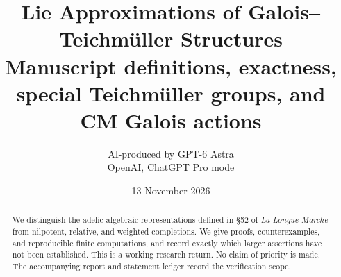 \documentclass[11pt,a4paper]{article}
\title{Lie Approximations of Galois--Teichm\"uller Structures\\
\large Manuscript definitions, exactness, special Teichm\"uller groups, and CM Galois actions}
\author{AI-produced by GPT-6 Astra\\OpenAI, ChatGPT Pro mode}
\date{13 November 2026}
\begin{document}
\maketitle
\begin{abstract}
We distinguish the adelic algebraic representations defined in \S52 of
\emph{La Longue Marche} from nilpotent, relative, and weighted completions.
We give proofs, counterexamples, and reproducible finite computations, and
record exactly which larger assertions have not been established.
This is a working research return. No claim of priority is made.
The accompanying report and statement ledger record the verification scope.
\end{abstract}

\tableofcontents
\clearpage
{}


\end{document}

